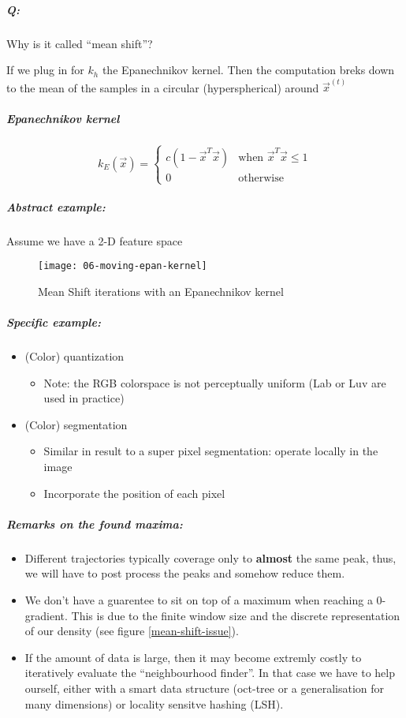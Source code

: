 \subparagraph{Q:} Why is it called ``mean shift''?

If we plug in for $k_h$ the Epanechnikov kernel. Then the computation breks down to the mean of the samples in a circular (hyperspherical) around $\vec{x}^{(t)}$

\subparagraph{Epanechnikov kernel}

\begin{equation*}
  k_E(\vec{x}) = \begin{cases}
    c (1 - \vec{x}^T \vec{x})&\text{when } \vec{x}^T \vec{x} \le 1\\
    0 &\text{otherwise}
  \end{cases}
\end{equation*}

\subparagraph{Abstract example:}
Assume we have a 2-D feature space

\begin{figure}[H]
  \centering
  \texttt{[image: 06-moving-epan-kernel]}
  \caption{Mean Shift iterations with an Epanechnikov kernel}
\end{figure}

\subparagraph{Specific example:}
\begin{itemize}
  \item (Color) quantization
    \begin{itemize}
      \item Note: the RGB colorspace is not perceptually uniform (Lab or Luv are used in practice)
    \end{itemize}
  \item (Color) segmentation
    \begin{itemize}
      \item Similar in result to a super pixel segmentation: operate locally in the image
      \item Incorporate the position of each pixel
    \end{itemize}
\end{itemize}

\subparagraph{Remarks on the found maxima:}
\begin{itemize}
  \item Different trajectories typically coverage only to \textbf{almost} the same peak, thus, we will have to post process the peaks and somehow reduce them.
  \item We don't have a guarentee to sit on top of a maximum when reaching a 0-gradient. This is due to the finite window size and the discrete representation of our density (see figure \ref{mean-shift-issue}).
  \item \label{mean-shift-cost-effectiveness} If the amount of data is large, then it may become extremly costly to iteratively evaluate the ``neighbourhood finder''. In that case we have to help ourself, either with a smart data structure (oct-tree or a generalisation for many dimensions) or locality sensitve hashing (LSH).
\end{itemize}
